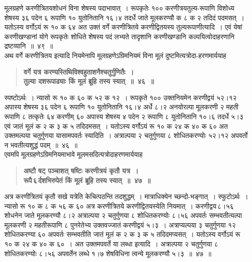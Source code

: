 \documentclass[11pt, openany]{book}
\begin{document}
\newpage

\begin{sloppypar}
\noindent मूलग्रहणे करणीत्रितयशोधनं विना शेषस्य पदाभावात्~। रूपकृतेः १०० करणीत्रयतुल्य-रूपाणि विशोध्य शेषस्य ३६ पदेन ६ रूपाणि १० युतोनितानि १६।४ तदर्धे जाते मूलकरण्यौ क ८ क २ तदिदं पदमसत्~। यतोऽस्य वर्गोऽयं रू १० क ६४ अत उक्तं वर्गे करणीत्रितये करणीद्वितयस्य तुल्यरूपाणीत्यादि~। एवं येषां करणीखण्डानां योगे रूपकृतेः शोधिते शेषस्य पदं लभ्यते तादृशानि करणीखण्डानि कल्पयित्वोदाहरणानि द्रष्टव्यानि~॥~४९~॥ \\

{\small अथ वर्गे करणीत्रितय इत्यादि नियमेनापि मूलग्रहणेऽग्रिमनियमं विना मूलं दुष्टमित्यत्रोदा-हरणमार्ययाह\textendash }

 \label{4.46}
\begin{quote}
{\large \textbf{{\color{purple}वर्गे यत्र करण्यस्तिथिविश्वहुताशनैश्चतुर्गुणितैः~।\\
तुल्या दशरूपाढ्याः किं मूलं ब्रूहि तस्य स्यात्~॥~४६~॥}}}
\end{quote}

स्पष्टोऽर्थः~। न्यासो रू १० क ६० क ५२ क १२~। रूपकृते १०० उक्तनियमेन करणीद्वयं ५२।१२ अपास्य शेषस्य ३६ पदेन ६ रूपाणि १० युतोनितानि १६।४ अर्धे ८।२ अनयोरल्पा मूलकरणी २ महती रूपाणि ८ तत्कृतेः ६४ करणीम् ६० अपास्य शेषस्य ४ पदेन २ रूपाणि ८ युतोनितानि १०।६ तदर्धे ५।३ एवं जातं मूलं क २ क ३ क ५ तदिदमसत्~। यतोऽस्य वर्गोऽयं रू १० क २४ क ४० क ६० अत उक्तमल्पया चतुर्गुणया यासामपवर्तः स्यादिति~। अत्राल्पया २ चतुर्गुणया ८ शोधितकरण्योः ५२।१२ अपवर्तो न भवतीत्यशुद्धं पदम्~॥~४६~॥\\

{\small एवमपि मूलग्रहणेऽग्रिमनियमाभावे मूलमसदित्यत्रोदाहरणमार्ययाह\textendash }

 \label{4.47}
\begin{quote}
{\large \textbf{{\color{purple}अष्टौ षट् पञ्चाशत् षष्टिः करणीत्रयं कृतौ यत्र~।\\
रूपै\textendash \,६\textendash \,र्दशभिरुपेतं किं मूलं ब्रूहि तस्य स्यात्~॥~४७~॥}}}
\end{quote}

अत्र करणीत्रितयं कृतौ सखे यत्रेति केचित्पठन्ति तदशुद्धम्~। मात्राधिक्येन च्छन्दो-भङ्गात्~। स्फुटोऽर्थः~। न्यासो रू १० क ८ क ५६ क ६० अत्र करणीत्रितये करणीद्वितयस्येति नियमात्~। करणीद्वय\textendash \,८।५६\textendash \,शोधनेन जाते मूलकरण्यौ ८।२ अत्राल्पया २ चतुर्गुणया ८ शोधितकरण्योः ८।५६ अपवर्तः सम्भवतीत्यल्पा मूलकरणी २ महतीरूपाणि ८ पुनरेतेभ्य उक्तवज्जातं करणीद्वयं ५।३~। अत्राप्यल्पया ३ चतुर्गुणया १२ शोधितकरण्या ६० अपवर्तः सम्भवतीति जातं मूलं क २ क ३ क ५ तदिदमप्यसत्~। यतोऽस्य वर्गोऽयं रू १० क २४ क ४० क ६०~। अत उक्तमपवर्ते या लब्धा इत्यादि~। अत्राल्पया २ चतुर्गुणया ८ शोधितकरण्योः ८।५६ अपवर्तेन लब्धे १।७ शेषविधिना त्वन्ये मूलकरण्यौ ५।३~॥~४७~॥
\end{sloppypar}
\end{document}
